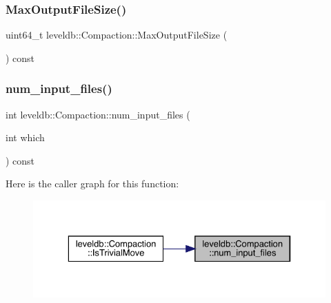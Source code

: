\subsubsection{\texorpdfstring{MaxOutputFileSize()}{MaxOutputFileSize()}}
{\footnotesize\ttfamily uint64\+\_\+t leveldb\+::\+Compaction\+::\+Max\+Output\+File\+Size (\begin{DoxyParamCaption}{ }\end{DoxyParamCaption}) const\hspace{0.3cm}{\ttfamily [inline]}}

\mbox{\label{classleveldb_1_1_compaction_a701f2fa2d3fb00af0847aa570506e743}} 
\subsubsection{\texorpdfstring{num\_input\_files()}{num\_input\_files()}}
{\footnotesize\ttfamily int leveldb\+::\+Compaction\+::num\+\_\+input\+\_\+files (\begin{DoxyParamCaption}\item[{int}]{which }\end{DoxyParamCaption}) const\hspace{0.3cm}{\ttfamily [inline]}}

Here is the caller graph for this function\+:
\nopagebreak
\begin{figure}[H]
\begin{center}
\leavevmode
\includegraphics[width=329pt]{classleveldb_1_1_compaction_a701f2fa2d3fb00af0847aa570506e743_icgraph}
\end{center}
\end{figure}
\mbox{\label{classleveldb_1_1_compaction_a87ec90747d22dce0d103149db1ecf709}} 
